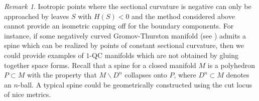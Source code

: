\documentclass[JEP,XML,SOM,Unicode]{cedram}
\let\moins\smallsetminus
\theoremstyle{definition}
\theoremstyle{remark}
\newtheorem{remark}[theorem]{Remark}
\numberwithin{equation}{section}
\begin{document}
\begin{remark}
Isotropic points where the sectional curvature is negative can only be approached by leaves $S$ with $H(S) <0$
and the method considered above cannot provide an isometric
capping off for the boundary components.
For instance, if some negatively curved Gromov-Thurston
manifold (see \cite{GT}) admits a spine which can be realized by
points of constant sectional curvature, then we could provide
examples of $1$-QC manifolds which are not obtained by gluing together space forms.
Recall that a spine for a closed manifold $M$ is a polyhedron $P\subset M$ with the property that
$M\moins D^n$ collapses onto $P$, where $D^n\subset M$ denotes an $n$-ball. A typical spine could be geometrically
constructed using the cut locus of nice metrics.
\end{remark}
\end{document}
